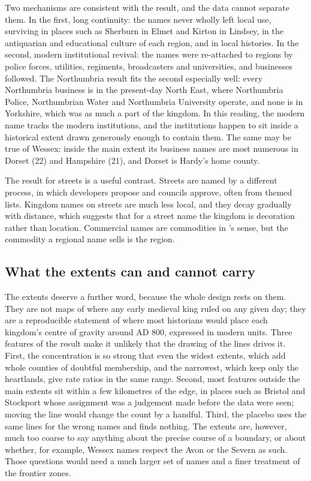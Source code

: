 \documentclass[11pt,a4paper]{article}
\begin{document}
Two mechanisms are consistent with the result, and the data cannot separate them. In the first, long continuity: the names never wholly left local use, surviving in places such as Sherburn in Elmet and Kirton in Lindsey, in the antiquarian and educational culture of each region, and in local histories. In the second, modern institutional revival: the names were re-attached to regions by police forces, utilities, regiments, broadcasters and universities, and businesses followed. The Northumbria result fits the second especially well: every Northumbria business is in the present-day North East, where Northumbria Police, Northumbrian Water and Northumbria University operate, and none is in Yorkshire, which was as much a part of the kingdom. In this reading, the modern name tracks the modern institutions, and the institutions happen to sit inside a historical extent drawn generously enough to contain them. The same may be true of Wessex: inside the main extent its business names are most numerous in Dorset (22) and Hampshire (21), and Dorset is Hardy's home county.

The result for streets is a useful contrast. Streets are named by a different process, in which developers propose and councils approve, often from themed lists. Kingdom names on streets are much less local, and they decay gradually with distance, which suggests that for a street name the kingdom is decoration rather than location. Commercial names are commodities in \citet{lightyoung2015}'s sense, but the commodity a regional name sells is the region.


\subsection{What the extents can and cannot carry}
The extents deserve a further word, because the whole design rests on them. They are not maps of where any early medieval king ruled on any given day; they are a reproducible statement of where most historians would place each kingdom's centre of gravity around AD 800, expressed in modern units. Three features of the result make it unlikely that the drawing of the lines drives it. First, the concentration is so strong that even the widest extents, which add whole counties of doubtful membership, and the narrowest, which keep only the heartlands, give rate ratios in the same range. Second, most features outside the main extents sit within a few kilometres of the edge, in places such as Bristol and Stockport whose assignment was a judgement made before the data were seen; moving the line would change the count by a handful. Third, the placebo uses the same lines for the wrong names and finds nothing. The extents are, however, much too coarse to say anything about the precise course of a boundary, or about whether, for example, Wessex names respect the Avon or the Severn as such. Those questions would need a much larger set of names and a finer treatment of the frontier zones.
\end{document}

